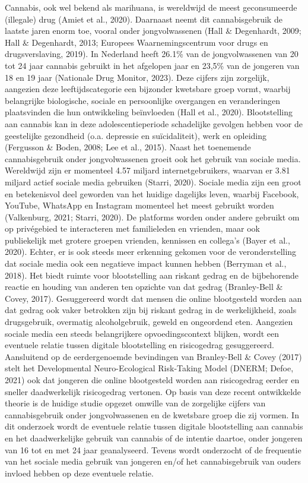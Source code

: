 \documentclass[
  letterpaper,
  DIV=11,
  numbers=noendperiod]{scrartcl}
\begin{document}
Cannabis, ook wel bekend als marihuana, is wereldwijd de meest
geconsumeerde (illegale) drug (Amiet et al., 2020). Daarnaast neemt dit
cannabisgebruik de laatste jaren enorm toe, vooral onder jongvolwassenen
(Hall \& Degenhardt, 2009; Hall \& Degenhardt, 2013; Europees
Waarnemingscentrum voor drugs en drugsverslaving, 2019). In Nederland
heeft 26.1\% van de jongvolwassenen van 20 tot 24 jaar cannabis gebruikt
in het afgelopen jaar en 23,5\% van de jongeren van 18 en 19 jaar
(Nationale Drug Monitor, 2023). Deze cijfers zijn zorgelijk, aangezien
deze leeftijdscategorie een bijzonder kwetsbare groep vormt, waarbij
belangrijke biologische, sociale en persoonlijke overgangen en
veranderingen plaatsvinden die hun ontwikkeling beïnvloeden (Hall et
al., 2020). Blootstelling aan cannabis kan in deze adolescentieperiode
schadelijke gevolgen hebben voor de geestelijke gezondheid (o.a.
depressie en suïcidaliteit), werk en opleiding (Fergusson \& Boden,
2008; Lee et al., 2015). Naast het toenemende cannabisgebruik onder
jongvolwassenen groeit ook het gebruik van sociale media. Wereldwijd
zijn er momenteel 4.57 miljard internetgebruikers, waarvan er 3.81
miljard actief sociale media gebruiken (Starri, 2020). Sociale media
zijn een groot en betekenisvol deel geworden van het huidige dagelijks
leven, waarbij Facebook, YouTube, WhatsApp en Instagram momenteel het
meest gebruikt worden (Valkenburg, 2021; Starri, 2020). De platforms
worden onder andere gebruikt om op privégebied te interacteren met
familieleden en vrienden, maar ook publiekelijk met grotere groepen
vrienden, kennissen en collega's (Bayer et al., 2020). Echter, er is ook
steeds meer erkenning gekomen voor de veronderstelling dat sociale media
ook een negatieve impact kunnen hebben (Berryman et al., 2018). Het
biedt ruimte voor blootstelling aan riskant gedrag en de bijbehorende
reactie en houding van anderen ten opzichte van dat gedrag (Branley-Bell
\& Covey, 2017). Gesuggereerd wordt dat mensen die online blootgesteld
worden aan dat gedrag ook vaker betrokken zijn bij riskant gedrag in de
werkelijkheid, zoals drugsgebruik, overmatig alcoholgebruik, geweld en
ongeordend eten. Aangezien sociale media een steeds belangrijkere
opvoedingscontext blijken, wordt een eventuele relatie tussen digitale
blootstelling en risicogedrag gesuggereerd. Aansluitend op de
eerdergenoemde bevindingen van Branley-Bell \& Covey (2017) stelt het
Developmental Neuro-Ecological Risk-Taking Model (DNERM; Defoe, 2021)
ook dat jongeren die online blootgesteld worden aan risicogedrag eerder
en sneller daadwerkelijk risicogedrag vertonen. Op basis van deze recent
ontwikkelde theorie is de huidige studie opgezet omwille van de
zorgelijke cijfers van cannabisgebruik onder jongvolwassenen en de
kwetsbare groep die zij vormen. In dit onderzoek wordt de eventuele
relatie tussen digitale blootstelling aan cannabis en het daadwerkelijke
gebruik van cannabis of de intentie daartoe, onder jongeren van 16 tot
en met 24 jaar geanalyseerd. Tevens wordt onderzocht of de frequentie
van het sociale media gebruik van jongeren en/of het cannabisgebruik van
ouders invloed hebben op deze eventuele relatie.
\end{document}
